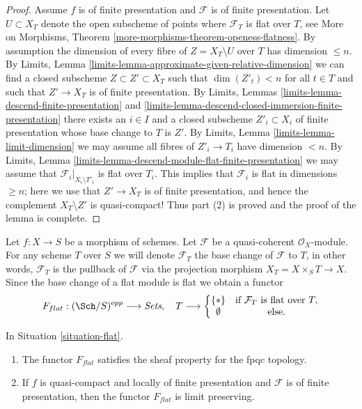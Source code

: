 \begin{proof}
\medskip\noindent
Assume $f$ is of finite presentation and $\mathcal{F}$ is of finite
presentation. Let $U \subset X_T$ denote the open subscheme of points where
$\mathcal{F}_T$ is flat over $T$, see
More on Morphisms, Theorem \ref{more-morphisms-theorem-openess-flatness}.
By assumption the dimension of every fibre of $Z = X_T \setminus U$ over
$T$ has dimension $\leq n$. By
Limits, Lemma \ref{limits-lemma-approximate-given-relative-dimension}
we can find a closed subscheme $Z \subset Z' \subset X_T$
such that $\dim(Z'_t) < n$ for all $t \in T$ and such that
$Z' \to X_T$ is of finite presentation. By
Limits, Lemmas \ref{limits-lemma-descend-finite-presentation} and
\ref{limits-lemma-descend-closed-immersion-finite-presentation}
there exists an $i \in I$ and a closed subscheme $Z'_i \subset X_i$
of finite presentation whose base change to $T$ is $Z'$. By
Limits, Lemma \ref{limits-lemma-limit-dimension}
we may assume all fibres of $Z'_i \to T_i$ have dimension $< n$. By
Limits, Lemma \ref{limits-lemma-descend-module-flat-finite-presentation}
we may assume that $\mathcal{F}_i|_{X_i \setminus T'_i}$
is flat over $T_i$. This implies that $\mathcal{F}_i$ is
flat in dimensions $\geq n$; here we use that $Z' \to X_T$ is of finite
presentation, and hence the complement $X_T \setminus Z'$ is quasi-compact!
Thus part (2) is proved and the proof of the lemma is complete.
\end{proof}

\begin{situation}
\label{situation-flat}
Let $f : X \to S$ be a morphism of schemes.
Let $\mathcal{F}$ be a quasi-coherent $\mathcal{O}_X$-module.
For any scheme $T$ over $S$ we will denote $\mathcal{F}_T$ the
base change of $\mathcal{F}$ to $T$, in other words, $\mathcal{F}_T$
is the pullback of $\mathcal{F}$ via the projection morphism
$X_T = X \times_S T \to X$. Since the base change of a flat module
is flat we obtain a functor
\begin{equation}
\label{equation-flat}
F_{flat} : (\Sch/S)^{opp} \longrightarrow \textit{Sets}, \quad
T \longrightarrow \left\{
\begin{matrix}
\{*\} & \text{if } \mathcal{F}_T \text{ is flat over }T, \\
\emptyset & \text{else.}
\end{matrix}
\right.
\end{equation}
\end{situation}

\begin{lemma}
\label{lemma-flat}
In Situation \ref{situation-flat}.
\begin{enumerate}
\item The functor $F_{flat}$ satisfies the sheaf property for the fpqc topology.
\item If $f$ is quasi-compact and locally of finite presentation
and $\mathcal{F}$ is of finite presentation, then the functor
$F_{flat}$ is limit preserving.
\end{enumerate}
\end{lemma}


